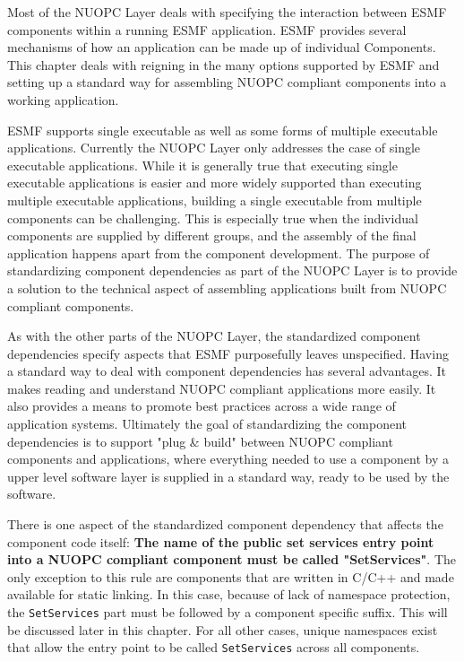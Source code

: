 
\label{componentDep}

Most of the NUOPC Layer deals with specifying the interaction between ESMF components within a running ESMF application. ESMF provides several mechanisms of how an application can be made up of individual Components. This chapter deals with reigning in the many options supported by ESMF and setting up a standard way for assembling NUOPC compliant components into a working application.

ESMF supports single executable as well as some forms of multiple executable applications. Currently the NUOPC Layer only addresses the case of single executable applications. While it is generally true that executing single executable applications is easier and more widely supported than executing multiple executable applications, building a single executable from multiple components can be challenging. This is especially true when the individual components are supplied by different groups, and the assembly of the final application happens apart from the component development. The purpose of standardizing component dependencies as part of the NUOPC Layer is to provide a solution to the technical aspect of assembling applications built from NUOPC compliant components.

As with the other parts of the NUOPC Layer, the standardized component dependencies specify aspects that ESMF purposefully leaves unspecified. Having a standard way to deal with component dependencies has several advantages. It makes reading and understand NUOPC compliant applications more easily. It also provides a means to promote best practices across a wide range of application systems. Ultimately the goal of standardizing the component dependencies is to support "plug \& build" between NUOPC compliant components and applications, where everything needed to use a component by a upper level software layer is supplied in a standard way, ready to be used by the software.

There is one aspect of the standardized component dependency that affects the component code itself: {\bf The name of the public set services entry point into a NUOPC compliant component must be called "SetServices"}. The only exception to this rule are components that are written in C/C++ and made available for static linking. In this case, because of lack of namespace protection, the {\tt SetServices} part must be followed by a component specific suffix. This will be discussed later in this chapter. For all other cases, unique namespaces exist that allow the entry point to be called {\tt SetServices} across all components.

